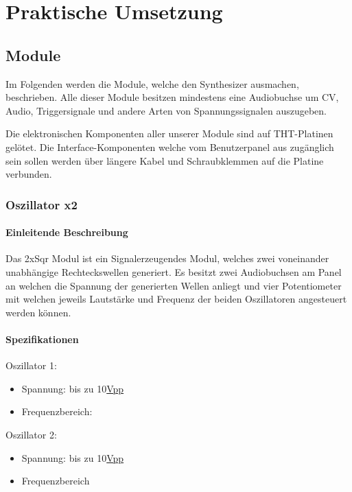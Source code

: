 \chapter{Praktische Umsetzung}

\section{Module}
\label{sec:org2864704}

Im Folgenden werden die Module, welche den Synthesizer ausmachen, beschrieben. Alle dieser Module besitzen mindestens eine Audiobuchse um CV, Audio, Triggersignale und andere Arten von Spannungssignalen auszugeben.

Die elektronischen Komponenten aller unserer Module sind auf THT-Platinen gelötet. Die Interface-Komponenten welche vom Benutzerpanel aus zugänglich sein sollen werden über längere Kabel und Schraubklemmen auf die Platine verbunden.

\subsection{Oszillator x2}
\label{sec:org5e70fcc}
\subsubsection{Einleitende Beschreibung}
\label{sec:org1ab2938}
Das 2xSqr Modul ist ein Signalerzeugendes Modul, welches zwei voneinander unabhängige Rechteckswellen generiert. Es besitzt zwei Audiobuchsen am Panel an welchen die Spannung der generierten Wellen anliegt und vier Potentiometer mit welchen jeweils Lautstärke und Frequenz der beiden Oszillatoren angesteuert werden können.

\subsubsection{Spezifikationen}
\label{sec:orgf1cb0b5}
Oszillator 1:
\begin{itemize}
\item Spannung: bis zu 10\href{file:///home/felixp/Documents/diplomarbeit/dokumentation/content/hauptteil.org}{Vpp}
\item Frequenzbereich:
\end{itemize}

Oszillator 2:
\begin{itemize}
\item Spannung: bis zu 10\href{file:///home/felixp/Documents/diplomarbeit/dokumentation/content/hauptteil.org}{Vpp}
\item Frequenzbereich
\end{itemize}

